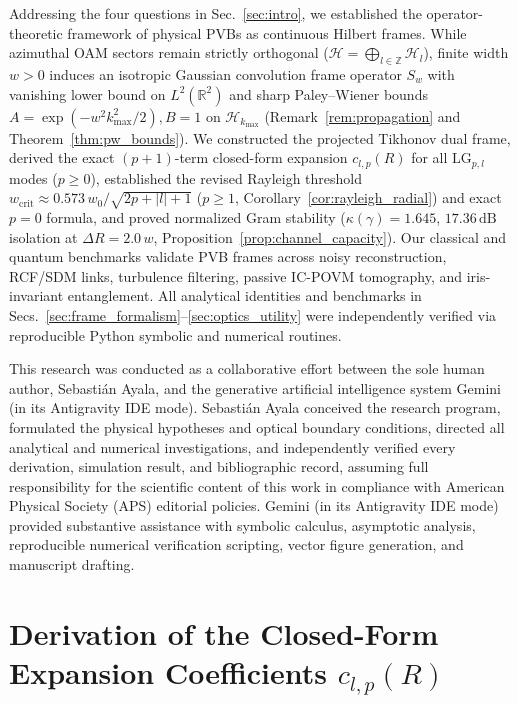 \documentclass[aps,pra,reprint,amsmath,amssymb,floatfix,longbibliography]{revtex4-2}
\providecommand{\abs}[1]{\lvert#1\rvert}
\begin{document}
Addressing the four questions in Sec.~\ref{sec:intro}, we established the operator-theoretic framework of physical PVBs as continuous Hilbert frames. While azimuthal OAM sectors remain strictly orthogonal ($\mathcal{H} = \bigoplus_{l\in\mathbb{Z}}\mathcal{H}_l$), finite width $w > 0$ induces an isotropic Gaussian convolution frame operator $S_w$ with vanishing lower bound on $L^2(\mathbb{R}^2)$ and sharp Paley--Wiener bounds $A = \exp(-w^2 k_{\max}^2/2), B = 1$ on $\mathcal{H}_{k_{\max}}$ (Remark~\ref{rem:propagation} and Theorem~\ref{thm:pw_bounds}). We constructed the projected Tikhonov dual frame, derived the exact $(p+1)$-term closed-form expansion $c_{l,p}(R)$ for all $\mathrm{LG}_{p,l}$ modes ($p \ge 0$), established the revised Rayleigh threshold $w_{\mathrm{crit}} \approx 0.573\,w_0/\sqrt{2p+\abs{l}+1}$ ($p \ge 1$, Corollary~\ref{cor:rayleigh_radial}) and exact $p=0$ formula, and proved normalized Gram stability ($\kappa(\gamma) = 1.645$, $17.36\,\mathrm{dB}$ isolation at $\Delta R = 2.0\,w$, Proposition~\ref{prop:channel_capacity}). Our classical and quantum benchmarks validate PVB frames across noisy reconstruction, RCF/SDM links, turbulence filtering, passive IC-POVM tomography, and iris-invariant entanglement. All analytical identities and benchmarks in Secs.~\ref{sec:frame_formalism}--\ref{sec:optics_utility} were independently verified via reproducible Python symbolic and numerical routines.

\begin{acknowledgments}
This research was conducted as a collaborative effort between the sole human author, Sebasti\'an Ayala, and the generative artificial intelligence system Gemini (in its Antigravity IDE mode). Sebasti\'an Ayala conceived the research program, formulated the physical hypotheses and optical boundary conditions, directed all analytical and numerical investigations, and independently verified every derivation, simulation result, and bibliographic record, assuming full responsibility for the scientific content of this work in compliance with American Physical Society (APS) editorial policies. Gemini (in its Antigravity IDE mode) provided substantive assistance with symbolic calculus, asymptotic analysis, reproducible numerical verification scripting, vector figure generation, and manuscript drafting.
\end{acknowledgments}

\appendix
\section{Derivation of the Closed-Form Expansion Coefficients \texorpdfstring{$c_{l,p}(R)$}{c\_\{l,p\}(R)}}
\label{app:lg_expansion}
\end{document}

